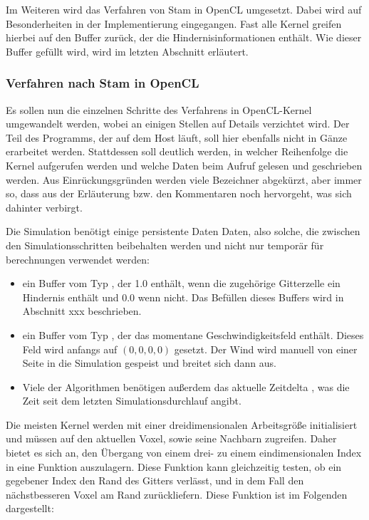 Im Weiteren wird das Verfahren von Stam in OpenCL umgesetzt. Dabei wird auf
Besonderheiten in der Implementierung eingegangen. Fast alle Kernel greifen
hierbei auf den Buffer zurück, der die Hindernisinformationen enthält. Wie
dieser Buffer gefüllt wird, wird im letzten Abschnitt erläutert.

\subsubsection{Verfahren nach Stam in OpenCL}

Es sollen nun die einzelnen Schritte des Verfahrens in OpenCL-Kernel umgewandelt
werden, wobei an einigen Stellen auf Details verzichtet wird. Der Teil des
Programms, der auf dem Host läuft, soll hier ebenfalls nicht in Gänze erarbeitet
werden. Stattdessen soll deutlich werden, in welcher Reihenfolge die Kernel
aufgerufen werden und welche Daten beim Aufruf gelesen und geschrieben werden.
Aus Einrückungsgründen werden viele Bezeichner abgekürzt, aber immer so, dass aus
der Erläuterung bzw. den Kommentaren noch hervorgeht, was sich dahinter
verbirgt.

Die Simulation benötigt einige persistente Daten Daten, also solche, die
zwischen den Simulationsschritten beibehalten werden und nicht nur temporär für
berechnungen verwendet werden:

\begin{itemize}
\item ein Buffer  vom Typ
, der 1.0 enthält, wenn die zugehörige Gitterzelle ein
Hindernis enthält und 0.0 wenn nicht. Das Befüllen dieses Buffers wird in
Abschnitt xxx beschrieben.
\item ein Buffer  vom Typ
, der das momentane Geschwindigkeitsfeld enthält.
Dieses Feld wird anfangs auf $(0,0,0,0)$ gesetzt. Der Wind wird manuell von
einer Seite in die Simulation gespeist und breitet sich dann aus.
\item Viele der Algorithmen benötigen außerdem das aktuelle Zeitdelta
, was die Zeit seit dem letzten Simulationsdurchlauf
angibt.
\end{itemize}

Die meisten Kernel werden mit einer dreidimensionalen Arbeitsgröße initialisiert
und müssen auf den aktuellen Voxel, sowie seine Nachbarn zugreifen. Daher bietet
es sich an, den Übergang von einem drei- zu einem eindimensionalen Index in eine
Funktion auszulagern. Diese Funktion kann gleichzeitig testen, ob ein gegebener
Index den Rand des Gitters verlässt, und in dem Fall den nächstbesseren Voxel am
Rand zurückliefern. Diese Funktion  ist im Folgenden
dargestellt:

